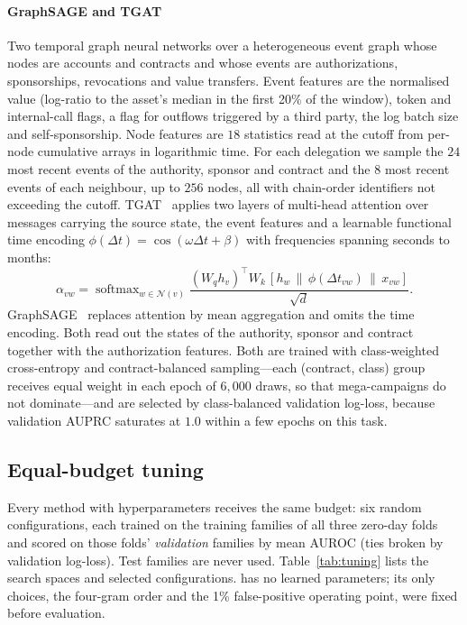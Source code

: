 \paragraph{GraphSAGE and TGAT} Two temporal graph neural networks over a heterogeneous event graph whose nodes are accounts and contracts and whose events are authorizations, sponsorships, revocations and value transfers. Event features are the normalised value (log-ratio to the asset's median in the first 20\% of the window), token and internal-call flags, a flag for outflows triggered by a third party, the log batch size and self-sponsorship. Node features are $18$ statistics read at the cutoff from per-node cumulative arrays in logarithmic time. For each delegation we sample the $24$ most recent events of the authority, sponsor and contract and the $8$ most recent events of each neighbour, up to $256$ nodes, all with chain-order identifiers not exceeding the cutoff. TGAT~\cite{xu2020tgat} applies two layers of multi-head attention over messages carrying the source state, the event features and a learnable functional time encoding $\phi(\Delta t)=\cos(\omega\Delta t+\beta)$ with frequencies spanning seconds to months:
\begin{equation}
\alpha_{vw}=\operatorname{softmax}_{w\in\mathcal{N}(v)}\frac{(W_q h_v)^{\top}W_k\,[h_w\,\|\,\phi(\Delta t_{vw})\,\|\,x_{vw}]}{\sqrt{d}} .
\end{equation}
GraphSAGE~\cite{hamilton2017graphsage} replaces attention by mean aggregation and omits the time encoding. Both read out the states of the authority, sponsor and contract together with the authorization features. Both are trained with class-weighted cross-entropy and contract-balanced sampling---each (contract, class) group receives equal weight in each epoch of $6{,}000$ draws, so that mega-campaigns do not dominate---and are selected by class-balanced validation log-loss, because validation AUPRC saturates at $1.0$ within a few epochs on this task.

\subsection{Equal-budget tuning}
Every method with hyperparameters receives the same budget: six random configurations, each trained on the training families of all three zero-day folds and scored on those folds' \emph{validation} families by mean AUROC (ties broken by validation log-loss). Test families are never used. Table~\ref{tab:tuning} lists the search spaces and selected configurations. \dn{} has no learned parameters; its only choices, the four-gram order and the 1\% false-positive operating point, were fixed before evaluation.

